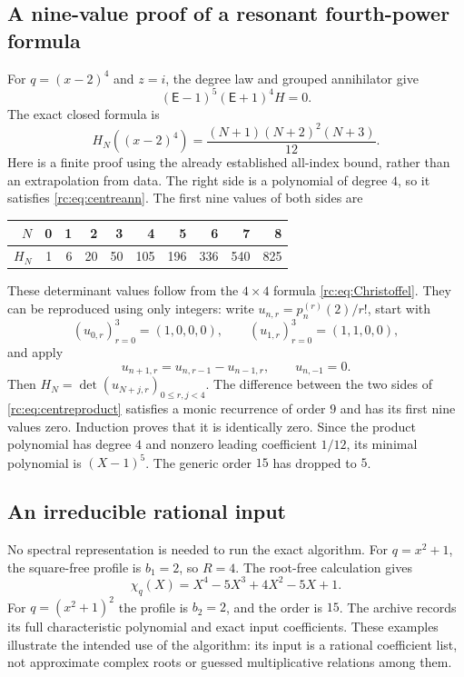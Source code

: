 \documentclass[11pt,a4paper]{article}
\numberwithin{equation}{section}
\theoremstyle{definition}
\theoremstyle{remark}
\newcommand{\E}{\mathsf E}
\begin{document}
\subsection{A nine-value proof of a resonant fourth-power formula}
For $q=(x-2)^4$ and $z=i$, the degree law and grouped annihilator give
\begin{equation}\label{rc:eq:centreann}
       (\E-1)^5(\E+1)^4H=0.
\end{equation}
The exact closed formula is
\begin{equation}\label{rc:eq:centreproduct}
 H_N((x-2)^4)=\frac{(N+1)(N+2)^2(N+3)}{12}.
\end{equation}
Here is a finite proof using the already established all-index bound,
rather than an extrapolation from data.  The right side is a polynomial
of degree $4$, so it satisfies \eqref{rc:eq:centreann}.  The first nine
values of both sides are
\begin{center}
\begin{tabular}{@{}rrrrrrrrrr@{}}
\toprule
$N$ &0&1&2&3&4&5&6&7&8\\
\midrule
$H_N$&1&6&20&50&105&196&336&540&825\\
\bottomrule
\end{tabular}
\end{center}
These determinant values follow from the $4\times4$ formula
\eqref{rc:eq:Christoffel}.  They can be reproduced using only integers:
write $u_{n,r}=p_n^{(r)}(2)/r!$, start with
\[
 (u_{0,r})_{r=0}^{3}=(1,0,0,0),\qquad
 (u_{1,r})_{r=0}^{3}=(1,1,0,0),
\]
and apply
\[
 u_{n+1,r}=u_{n,r-1}-u_{n-1,r},\qquad u_{n,-1}=0.
\]
Then $H_N=\det(u_{N+j,r})_{0\le r,j<4}$.
The difference between the two sides of \eqref{rc:eq:centreproduct}
satisfies a monic recurrence of order $9$ and has its first nine
values zero.  Induction proves that it is identically zero.
Since the product polynomial has degree $4$ and nonzero leading
coefficient $1/12$, its minimal polynomial is $(X-1)^5$.
The generic order $15$ has dropped to $5$.

\noindent[Added 29 September 2026, batch 42: \eqref{rc:eq:squarecentral}
and \eqref{rc:eq:centreproduct} are the cases $t=2,4$ of a known product
of Cigler for every~$t$, printed with a condensation proof as
Theorem~\ref{cyc:thm:central} in Part~III.]

\subsection{An irreducible rational input}
No spectral representation is needed to run the exact algorithm.
For $q=x^2+1$, the square-free profile is $b_1=2$, so $R=4$.
The root-free calculation gives
\begin{equation}\label{rc:eq:irreducible}
 \chi_q(X)=X^4-5X^3+4X^2-5X+1.
\end{equation}
For $q=(x^2+1)^2$ the profile is $b_2=2$, and the order is $15$.
The archive records its full characteristic polynomial and exact input
coefficients.  These examples illustrate the intended use of the
algorithm: its input is a rational coefficient list, not approximate
complex roots or guessed multiplicative relations among them.
\end{document}
